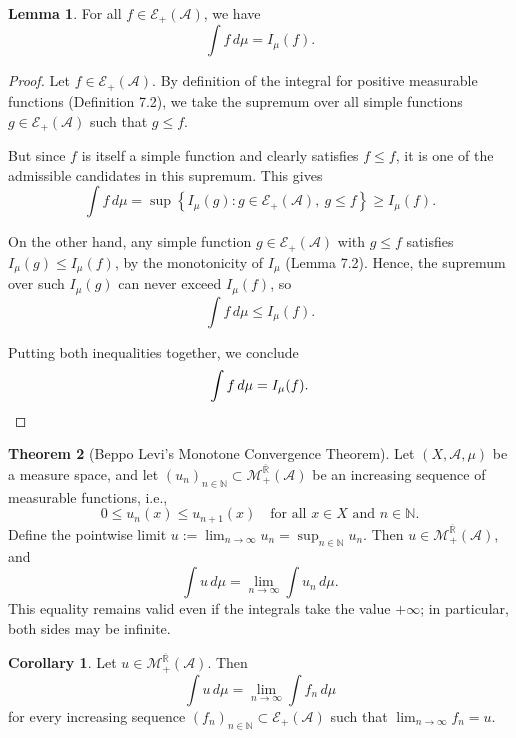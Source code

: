 \documentclass[12pt]{article}
\theoremstyle{definition}
\newtheorem{theorem}{Theorem}[section]
\newtheorem{corollary}{Corollary}[theorem]
\newtheorem{lemma}[theorem]{Lemma}
\begin{document}
\medskip
\begin{lemma}
For all \( f \in \mathcal{E}_+(\mathcal{A}) \), we have
\[
\int f \, d\mu = I_\mu(f).
\]
\end{lemma}

\begin{proof}
Let \( f \in \mathcal{E}_+(\mathcal{A}) \). By definition of the integral for positive measurable functions (Definition 7.2), we take the supremum over all simple functions \( g \in \mathcal{E}_+(\mathcal{A}) \) such that \( g \leq f \).

But since \( f \) is itself a simple function and clearly satisfies \( f \leq f \), it is one of the admissible candidates in this supremum. This gives
\[
\int f \, d\mu = \sup \left\{ I_\mu(g) : g \in \mathcal{E}_+(\mathcal{A}),\ g \leq f \right\} \geq I_\mu(f).
\]

On the other hand, any simple function \( g \in \mathcal{E}_+(\mathcal{A}) \) with \( g \leq f \) satisfies \( I_\mu(g) \leq I_\mu(f) \), by the monotonicity of \( I_\mu \) (Lemma 7.2). Hence, the supremum over such \( I_\mu(g) \) can never exceed \( I_\mu(f) \), so
\[
\int f \, d\mu \leq I_\mu(f).
\]

Putting both inequalities together, we conclude
\[
\int f \, d\mu = I_\mu(f). \qedhere
\]
\end{proof}

\medskip
\begin{theorem}[Beppo Levi's Monotone Convergence Theorem]
Let \( (X, \mathcal{A}, \mu) \) be a measure space, and let \( (u_n)_{n \in \mathbb{N}} \subset \mathcal{M}_+^{\overline{\mathbb{R}}}(\mathcal{A}) \) be an increasing sequence of measurable functions, i.e.,
\[
0 \leq u_n(x) \leq u_{n+1}(x) \quad \text{for all } x \in X \text{ and } n \in \mathbb{N}.
\]
Define the pointwise limit \( u := \lim_{n \to \infty} u_n = \sup_{n \in \mathbb{N}} u_n \). Then \( u \in \mathcal{M}_+^{\overline{\mathbb{R}}}(\mathcal{A}) \), and
\[
\int u \, d\mu = \lim_{n \to \infty} \int u_n \, d\mu.
\]
This equality remains valid even if the integrals take the value \( +\infty \); in particular, both sides may be infinite.
\end{theorem}

\medskip
\begin{corollary}
Let \( u \in \mathcal{M}_+^{\overline{\mathbb{R}}}(\mathcal{A}) \). Then
\[
\int u \, d\mu = \lim_{n \to \infty} \int f_n \, d\mu
\]
for every increasing sequence \( (f_n)_{n \in \mathbb{N}} \subset \mathcal{E}_+(\mathcal{A}) \) such that \( \lim_{n \to \infty} f_n = u \).
\end{corollary}
\end{document}
